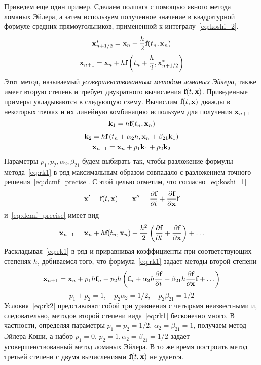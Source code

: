 Приведем еще один пример. Сделаем полшага с помощью явного метода ломаных Эйлера, а затем используем полученное значение
в квадратурной формуле средних прямоугольников, примененной к интегралу~\eqref{eq:koshi_2}.
\begin{equation}
    \bf{x}_{n+1/2}^* = \bf{x}_n + \frac{h}{2}\bf{f}(t_n, \bf{x}_n)
\end{equation}
\begin{equation*}
    \bf{x}_{n+1} = \bf{x}_n + h\bf{f}\left( t_n + \frac{h}{2}, \bf{x}_{n+1/2}^* \right)
\end{equation*}
Этот метод, называемый \emph{усовершенствованным методом ломаных Эйлера}, также имеет вторую степень и требует
двукратного вычисления $\bf{f}(t, \bf{x})$. Приведенные примеры укладываются в следующую схему. Вычислим
$\bf{f}(t, \bf{x})$ дважды в некоторых точках и их линейную комбинацию используем для получения $\bf{x}_{n+1}$
\begin{equation}
    \bf{k}_1 = h\bf{f}(t_n, \bf{x}_n) \label{eq:rk1}
\end{equation}
\begin{gather*}
    \bf{k}_2 = h\bf{f}\left( t_n + \alpha_2 h, \bf{x}_n + \beta_{21} \bf{k}_1 \right) \\
    \bf{x}_{n+1} = \bf{x}_n + p_1 \bf{k}_1 + p_2 \bf{k}_2
\end{gather*}
Параметры $p_1, p_2, \alpha_2, \beta_{21}$ будем выбирать так, чтобы разложение формулы метода~\eqref{eq:rk1} в ряд максимальным
образом совпадало с разложением точного решения~\eqref{eq:dcmf_precise}. С этой целью отметим, что согласно~\eqref{eq:koshi_1}
\begin{equation*}
    \bf{x}' = \bf{f}(t, \bf{x}) \qquad \bf{x}'' = \frac{\partial \bf{f}}{\partial t} + \frac{\partial \bf{f}}{\partial \bf{x}}\bf{f}
\end{equation*}
и~\eqref{eq:dcmf_precise} имеет вид
\begin{equation*}
    \bf{x}_{n+1} = \bf{x}_n + h\bf{f}(t_n, \bf{x}_n) + \frac{h^2}{2}\left( \frac{\partial \bf{f}}{\partial t} + \frac{\partial \bf{f}}{\partial \bf{x}} \right) + \ldots
\end{equation*}
Раскладывая~\eqref{eq:rk1} в ряд и приравнивая коэффициенты при соответствующих степенях $h$, добиваемся того, что
формула~\eqref{eq:rk1} задает методы второй степени
\begin{equation*}
    \bf{x}_{n+1} = \bf{x}_n + p_1 h \bf{f}_n + p_2 h\left( \bf{f}_n + \alpha_2 h \frac{\partial \bf{f}}{\partial t} + \beta_{21} h \frac{\partial \bf{f}}{\partial \bf{x}}\bf{f} + \ldots \right)
\end{equation*}
\begin{equation}
    p_1 + p_2 = 1, \quad p_2 \alpha_2 = 1/2, \quad p_2 \beta_{21} = 1/2 \label{eq:rk2}
\end{equation}
Условия~\eqref{eq:rk2} представляют собой три уравнения с четырьмя неизвестными и, следовательно, методов второй степени
вида~\eqref{eq:rk1} бесконечно много. В частности, определяя параметры $p_1 = p_2 = 1/2, \, \alpha_2 = \beta_{21} = 1$, получаем
метод Эйлера-Коши, а набор $p_1 = 0, \, p_2 = 1, \alpha_2 = \beta_{21} = 1/2$ задает усовершенствованный метод ломаных Эйлера. В
то же время построить метод третьей степени с двумя вычислениями $\bf{f}(t, \bf{x})$ не удается.

